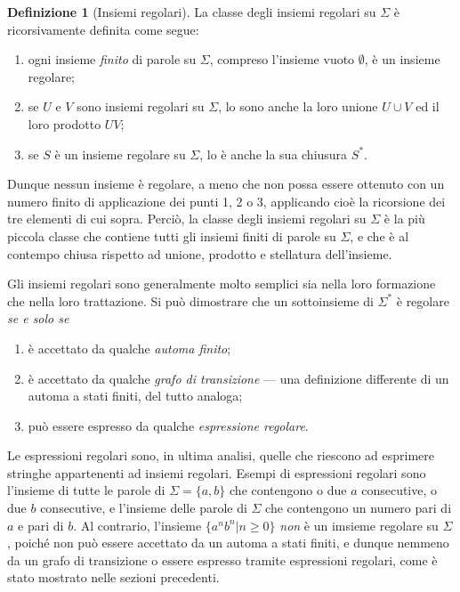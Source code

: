 \documentclass[10pt]{\classname}
\theoremstyle{newlinethm}
\theoremstyle{theorem}
\theoremstyle{definition}
\newtheorem{definizione}{Definizione}[section]
\theoremstyle{definition}
\theoremstyle{definition}
\theoremstyle{definition}
\begin{document}
\begin{definizione}[Insiemi regolari]\label{def:insiemi-regolari}
    La classe degli insiemi regolari su $\Sigma$ è ricorsivamente definita come segue:
    \begin{enumerate}
        \item ogni insieme \emph{finito} di parole su $\Sigma$, compreso l'insieme
            vuoto $\emptyset$, è un insieme regolare;
        \item se $U$ e $V$ sono insiemi regolari su $\Sigma$, lo sono anche la loro
            unione $U\cup V$ ed il loro prodotto $UV$;
        \item se $S$ è un insieme regolare su $\Sigma$, lo è anche la sua chiusura
            $S^*$.
    \end{enumerate}
\end{definizione}

Dunque nessun insieme è regolare, a meno che non possa essere ottenuto con un
numero finito di applicazione dei punti 1, 2 o 3, applicando cioè la ricorsione dei tre elementi di cui sopra. Perciò, la classe degli
insiemi regolari su $\Sigma$ è la più piccola classe che contiene tutti gli
insiemi finiti di parole su $\Sigma$, e che è al contempo chiusa rispetto ad
unione, prodotto e stellatura dell'insieme.

Gli insiemi regolari sono generalmente molto semplici sia nella loro formazione che nella loro trattazione. Si può dimostrare che un sottoinsieme di
$\Sigma^*$ è regolare \emph{se e solo se}

\begin{enumerate}
    \item è accettato da qualche \emph{automa finito};
    \item è accettato da qualche \emph{grafo di transizione} --- una
        definizione differente di un automa a stati finiti, del tutto analoga;
    \item può essere espresso da qualche \emph{espressione regolare}.
\end{enumerate}

Le espressioni regolari sono, in ultima analisi, quelle che riescono ad
esprimere stringhe appartenenti ad insiemi regolari. Esempi di espressioni
regolari sono l'insieme di tutte le parole di $\Sigma = \{a, b\}$ che
contengono o due $a$ consecutive, o due $b$ consecutive, e l'insieme delle
parole di $\Sigma$ che contengono un numero pari di $a$ e pari di $b$. Al
contrario, l'insieme $\{a^n b^n| n\geq 0\}$ \emph{non} è un imsieme regolare su
$\Sigma$, poiché non può essere accettato da un automa a stati finiti, e dunque nemmeno da un grafo di transizione o essere espresso tramite espressioni regolari, come è stato mostrato nelle sezioni precedenti.
\end{document}
